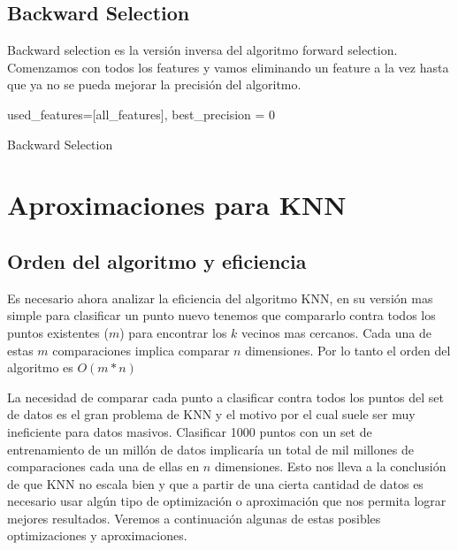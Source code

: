 \subsection{Backward Selection}

Backward selection es la versión inversa del algoritmo forward selection. Comenzamos con todos los features y vamos eliminando un feature a la vez hasta que ya no se pueda mejorar la precisión del algoritmo. 

\begin{algorithm}[]
  used\_features=[all\_features], best\_precision = 0\;
 \caption{Backward Selection}
\end{algorithm}

\section{Aproximaciones para KNN}

\subsection{Orden del algoritmo y eficiencia}

Es necesario ahora analizar la eficiencia del algoritmo KNN, en su versión mas simple para clasificar un punto nuevo tenemos que compararlo contra todos los puntos existentes ($m$) para encontrar los $k$ vecinos mas cercanos. Cada una de estas $m$ comparaciones implica comparar $n$ dimensiones. Por lo tanto el orden del algoritmo es $O(m*n)$

La necesidad de comparar cada punto a clasificar contra todos los puntos del set de datos es el gran problema de KNN y el motivo por el cual suele ser muy ineficiente para datos masivos. Clasificar 1000 puntos con un set de entrenamiento de un millón de datos implicaría un total de mil millones de comparaciones cada una de ellas en $n$ dimensiones. Esto nos lleva a la conclusión de que KNN no escala bien y que a partir de una cierta cantidad de datos es necesario usar algún tipo de optimización o aproximación que nos permita lograr mejores resultados. Veremos a continuación algunas de estas posibles optimizaciones y aproximaciones.

